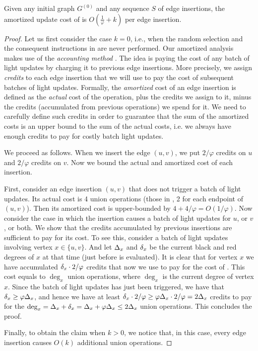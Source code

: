 \begin{lemma}
    \label{lm:amortized_det_alg}
    Given any initial graph $G^{(0)}$ and any sequence $S$ of edge insertions, the amortized update cost of  is $O(\frac{1}{\varphi}+k)$ per edge insertion.
\end{lemma}
\begin{proof}
    Let us first consider the case $k=0$, i.e., when the random selection and the consequent instructions in  are never performed.  Our amortized analysis makes use of the \textit{accounting method} \cite{Tarjan_amortized}. The idea is  paying  the cost of any batch of light updates by charging it to previous edge insertions. More precisely, we assign \emph{credits} to each edge insertion that we will use to pay the cost of subsequent batches of light updates. Formally, the \emph{amortized} cost of an edge insertion is defined as the \emph{actual} cost of the operation, plus the credits we assign to it, minus the credits (accumulated from previous operations) we spend for it. We need to carefully define such credits in order to guarantee that the sum of the amortized costs is an upper bound to the sum of the actual costs, i.e. we always have enough credits to pay for costly batch light updates.
    
    We proceed as follows. When we insert the edge $(u,v)$, we put $2/\varphi$ credits on $u$ and $2/\varphi$ credits on $v$. Now we bound the actual and amortized cost of each insertion. 
    
    First, consider an edge insertion $(u,v)$ that does not trigger a batch of light updates. Its actual cost is 4 union operations (those in , 2 for each endpoint of $(u,v)$). Then its amortized cost is upper-bounded by $4+4/\varphi=O(1/\varphi)$. Now consider the case in which the insertion causes a batch of light updates for $u$, or $v$, or both. We show that the credits accumulated by previous insertions are sufficient to pay for its cost. To see this, consider a batch of light updates involving vertex $x \in \{u,v\}$. And let $\Delta_x$ and $\delta_x$ be the current black and red degrees of $x$ at that time (just before  is evaluated). It is clear that for vertex $x$ we have accumulated  $\delta_x \cdot 2/\varphi$ credits that now we use to pay for the cost of . This cost equals to $\deg_x$ union operations, where $\deg_x$ is the current degree of vertex $x$. Since the batch of light updates has just been triggered, we have that $\delta_x \ge \varphi \Delta_x$, and hence we have at least $\delta_x \cdot 2/\varphi \ge \varphi \Delta_x \cdot 2/\varphi=2 \Delta_x$ credits to pay for the $\deg_x=\Delta_x+\delta_x=\Delta_x+\varphi\Delta_x \le 2 \Delta_x$ union operations. This concludes the proof. 

    Finally, to obtain the claim when $k>0$, we notice that, in this case, every edge insertion causes $O(k)$ additional union operations.
\end{proof}

